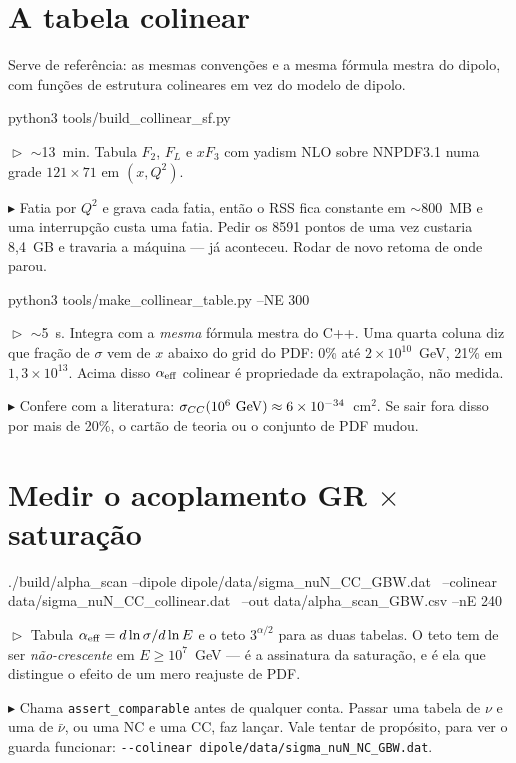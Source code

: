 \documentclass[10pt,a4paper]{article}
\newcommand{\teste}[1]{%
  \par\vspace{1pt}\noindent
  {\color{verde}\footnotesize$\vartriangleright$}\hspace{3pt}%
  {\color{cinza}\footnotesize #1}\par\vspace{7pt}}
\newcommand{\aviso}[1]{%
  \par\vspace{1pt}\noindent
  {\color{ferrugem}\footnotesize$\blacktriangleright$}\hspace{3pt}%
  {\color{cinza}\footnotesize #1}\par\vspace{7pt}}
\begin{document}
\section{A tabela colinear}

Serve de referência: as mesmas convenções e a mesma fórmula mestra do
dipolo, com funções de estrutura colineares em vez do modelo de dipolo.

\begin{comando}
python3 tools/build_collinear_sf.py
\end{comando}
\teste{$\sim$13~min. Tabula $F_2$, $F_L$ e $xF_3$ com yadism NLO sobre
NNPDF3.1 numa grade $121\times71$ em $(x,Q^2)$.}
\aviso{Fatia por $Q^2$ e grava cada fatia, então o RSS fica constante em
$\sim$800~MB e uma interrupção custa uma fatia. Pedir os 8591 pontos de
uma vez custaria 8,4~GB e travaria a máquina --- já aconteceu. Rodar de
novo retoma de onde parou.}

\begin{comando}
python3 tools/make_collinear_table.py --NE 300
\end{comando}
\teste{$\sim$5~s. Integra com a \emph{mesma} fórmula mestra do C++. Uma
quarta coluna diz que fração de $\sigma$ vem de $x$ abaixo do grid do
PDF: 0\% até $2\times10^{10}$~GeV, 21\% em $1{,}3\times10^{13}$. Acima
disso $\alpha_{\rm eff}$ colinear é propriedade da extrapolação, não
medida.}
\aviso{Confere com a literatura: $\sigma_{CC}(10^6~{\rm GeV}) \approx
6\times10^{-34}$~cm$^2$. Se sair fora disso por mais de 20\%, o cartão de
teoria ou o conjunto de PDF mudou.}

\section{Medir o acoplamento GR $\times$ saturação}

\begin{comando}
./build/alpha_scan --dipole dipole/data/sigma_nuN_CC_GBW.dat \
                   --colinear data/sigma_nuN_CC_collinear.dat \
                   --out data/alpha_scan_GBW.csv --nE 240
\end{comando}
\teste{Tabula $\alpha_{\rm eff} = d\ln\sigma/d\ln E$ e o teto
$3^{\alpha/2}$ para as duas tabelas. O teto tem de ser
\emph{não-crescente} em $E \geq 10^7$~GeV --- é a assinatura da
saturação, e é ela que distingue o efeito de um mero reajuste de PDF.}
\aviso{Chama \texttt{assert\_comparable} antes de qualquer conta. Passar
uma tabela de $\nu$ e uma de $\bar\nu$, ou uma NC e uma CC, faz lançar.
Vale tentar de propósito, para ver o guarda funcionar:
\texttt{-{}-colinear dipole/data/sigma\_nuN\_NC\_GBW.dat}.}
\end{document}
